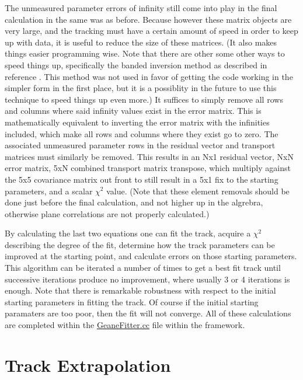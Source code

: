     The unmeasured parameter errors of infinity still come into play in the final calculation in the same was as before. Because however these matrix objects are very large, and the tracking must have a certain amount of speed in order to keep up with data, it is useful to reduce the size of these matrices. (It also makes things easier programming wise. Note that there are other some other ways to speed things up, specifically the banded inversion method as described in reference \cite{trajfit}. This method was not used in favor of getting the code working in the simpler form in the first place, but it is a possiblity in the future to use this technique to speed things up even more.) It suffices to simply remove all rows and columns where said infinity values exist in the error matrix. This is mathematically equivalent to inverting the error matrix with the infinities included, which make all rows and columns where they exist go to zero. The associated unmeasured parameter rows in the residual vector and transport matrices must similarly be removed. This results in an Nx1 residual vector, NxN error matrix, 5xN combined transport matrix transpose, which multiply against the 5x5 covariance matrix out front to still result in a 5x1 fix to the starting parameters, and a scalar $\chi^2$ value. (Note that these element removals should be done just before the final calculation, and not higher up in the algrebra, otherwise plane correlations are not properly calculated.)

    By calculating the last two equations one can fit the track, acquire a $\chi^{2}$ describing the degree of the fit, determine how the track parameters can be improved at the starting point, and calculate errors on those starting parameters. This algorithm can be iterated a number of times to get a best fit track until successive iterations produce no improvement, where usually 3 or 4 iterations is enough. Note that there is remarkable robustness with respect to the initial starting parameters in fitting the track. Of course if the initial starting paramaters are too poor, then the fit will not converge. All of these calculations are completed within the \hyperref[sec:GeaneFitter]{GeaneFitter.cc} file within the framework.





\section{Track Extrapolation}
\label{sec:Track Extrapolation}





